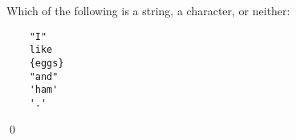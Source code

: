 Which of the following is a string, a character, or neither:
\begin{verbatim}
    "I"      
    like     
    {eggs}   
    "and"    
    'ham'    
    '.'      
\end{verbatim}
\qed
